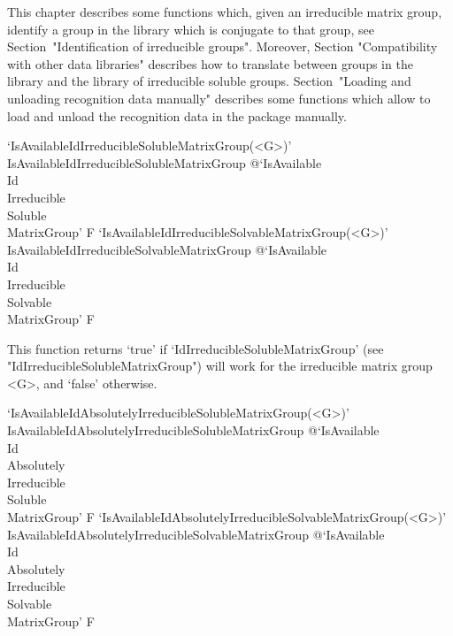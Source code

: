 

This chapter describes some functions which, given an irreducible matrix 
group, identify a group in the {\IRREDSOL} library which is conjugate
to that group, see Section~"Identification of irreducible groups".
Moreover,  Section "Compatibility with other data libraries" describes
how to  translate between groups in the {\IRREDSOL} library and the
{\GAP}  library of irreducible soluble groups. 
Section~"Loading and unloading recognition data manually" describes some 
functions which allow to load and unload the recognition data in the 
{\IRREDSOL} package manually.

\null

\>`IsAvailableIdIrreducibleSolubleMatrixGroup(<G>)'%
{IsAvailableIdIrreducibleSolubleMatrixGroup}%
@{`IsAvailable\\Id\\Irreducible\\Soluble\\MatrixGroup'} F
\>`IsAvailableIdIrreducibleSolvableMatrixGroup(<G>)'%
{IsAvailableIdIrreducibleSolvableMatrixGroup}%
@{`IsAvailable\\Id\\Irreducible\\Solvable\\MatrixGroup'} F

This function returns `true' if `IdIrreducibleSolubleMatrixGroup' (see
"IdIrreducibleSolubleMatrixGroup") will work for the irreducible matrix group <G>, and `false' otherwise.

\>`IsAvailableIdAbsolutelyIrreducibleSolubleMatrixGroup(<G>)'%
{IsAvailableIdAbsolutelyIrreducibleSolubleMatrixGroup}%
@{`IsAvailable\\Id\\Absolutely\\Irreducible\\Soluble\\MatrixGroup'} F
\>`IsAvailableIdAbsolutelyIrreducibleSolvableMatrixGroup(<G>)'%
{IsAvailableIdAbsolutelyIrreducibleSolvableMatrixGroup}%
@{`IsAvailable\\Id\\Absolutely\\Irreducible\\Solvable\\MatrixGroup'} F

